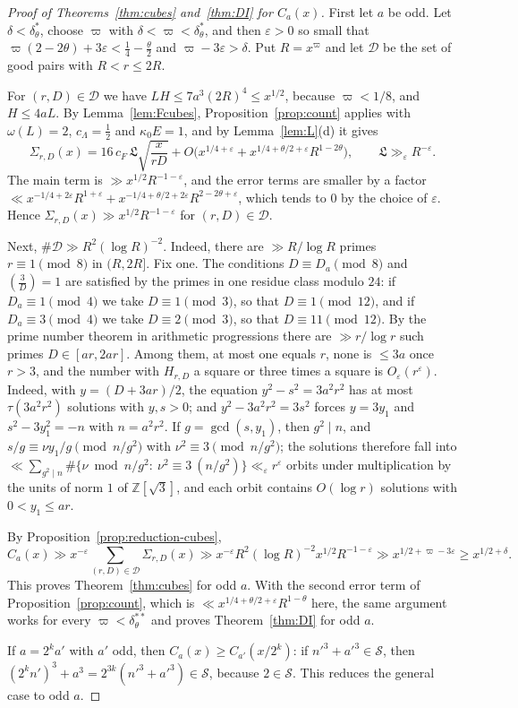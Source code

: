 \documentclass[11pt]{amsart}
\theoremstyle{remark}
\theoremstyle{definition}
\numberwithin{equation}{section}
\newcommand{\Sc}{\mathcal{S}}
\newcommand{\Dc}{\mathcal{D}}
\newcommand{\Z}{\mathbb{Z}}
\newcommand{\eps}{\varepsilon}
\newcommand{\Lf}{\mathfrak{L}}
\newcommand{\leg}[2]{\left(\frac{#1}{#2}\right)}
\begin{document}
\begin{proof}[Proof of Theorems~\ref{thm:cubes} and~\ref{thm:DI} for $C_a(x)$]
First let $a$ be odd. Let $\delta<\delta^*_\theta$, choose $\varpi$ with $\delta<\varpi<\delta^*_\theta$, and then $\eps>0$ so small that $\varpi(2-2\theta)+3\eps<\frac14-\frac\theta2$ and $\varpi-3\eps>\delta$. Put $R=x^{\varpi}$ and let $\Dc$ be the set of good pairs with $R<r\le2R$.

For $(r,D)\in\Dc$ we have $LH\le7a^3(2R)^4\le x^{1/2}$, because $\varpi<1/8$, and $H\le4aL$. By Lemma~\ref{lem:Fcubes}, Proposition~\ref{prop:count} applies with $\omega(L)=2$, $c_\Lambda=\frac12$ and $\kappa_0E=1$, and by Lemma~\ref{lem:L}(d) it gives
\[
\Sigma_{r,D}(x)=16\,c_F\,\Lf\sqrt{\frac x{rD}}+O\bigl(x^{1/4+\eps}+x^{1/4+\theta/2+\eps}R^{1-2\theta}\bigr),\qquad\Lf\gg_\eps R^{-\eps}.
\]
The main term is $\gg x^{1/2}R^{-1-\eps}$, and the error terms are smaller by a factor $\ll x^{-1/4+2\eps}R^{1+\eps}+x^{-1/4+\theta/2+2\eps}R^{2-2\theta+\eps}$, which tends to $0$ by the choice of $\eps$. Hence $\Sigma_{r,D}(x)\gg x^{1/2}R^{-1-\eps}$ for $(r,D)\in\Dc$.

Next, $\#\Dc\gg R^2(\log R)^{-2}$. Indeed, there are $\gg R/\log R$ primes $r\equiv1\pmod 8$ in $(R,2R]$. Fix one. The conditions $D\equiv D_a\pmod8$ and $\leg3D=1$ are satisfied by the primes in one residue class modulo $24$: if $D_a\equiv1\pmod4$ we take $D\equiv1\pmod3$, so that $D\equiv1\pmod{12}$, and if $D_a\equiv3\pmod4$ we take $D\equiv2\pmod3$, so that $D\equiv11\pmod{12}$. By the prime number theorem in arithmetic progressions there are $\gg r/\log r$ such primes $D\in[ar,2ar]$. Among them, at most one equals $r$, none is $\le3a$ once $r>3$, and the number with $H_{r,D}$ a square or three times a square is $O_\eps(r^{\eps})$. Indeed, with $y=(D+3ar)/2$, the equation $y^2-s^2=3a^2r^2$ has at most $\tau(3a^2r^2)$ solutions with $y,s>0$; and $y^2-3a^2r^2=3s^2$ forces $y=3y_1$ and $s^2-3y_1^2=-n$ with $n=a^2r^2$. If $g=\gcd(s,y_1)$, then $g^2\mid n$, and $s/g\equiv\nu y_1/g\pmod{n/g^2}$ with $\nu^2\equiv3\pmod{n/g^2}$; the solutions therefore fall into $\ll\sum_{g^2\mid n}\#\{\nu\bmod n/g^2:\ \nu^2\equiv3\ (n/g^2)\}\ll_\eps r^\eps$ orbits under multiplication by the units of norm $1$ of $\Z[\sqrt3]$, and each orbit contains $O(\log r)$ solutions with $0<y_1\le ar$.

By Proposition~\ref{prop:reduction-cubes},
\[
C_a(x)\gg x^{-\eps}\sum_{(r,D)\in\Dc}\Sigma_{r,D}(x)\gg x^{-\eps}R^{2}(\log R)^{-2}x^{1/2}R^{-1-\eps}\gg x^{1/2+\varpi-3\eps}\ge x^{1/2+\delta}.
\]
This proves Theorem~\ref{thm:cubes} for odd $a$. With the second error term of Proposition~\ref{prop:count}, which is $\ll x^{1/4+\theta/2+\eps}R^{1-\theta}$ here, the same argument works for every $\varpi<\delta^{**}_\theta$ and proves Theorem~\ref{thm:DI} for odd $a$.

If $a=2^ka'$ with $a'$ odd, then $C_a(x)\ge C_{a'}(x/2^k)$: if $n'^3+a'^3\in\Sc$, then $(2^kn')^3+a^3=2^{3k}(n'^3+a'^3)\in\Sc$, because $2\in\Sc$. This reduces the general case to odd $a$.
\end{proof}
\end{document}
